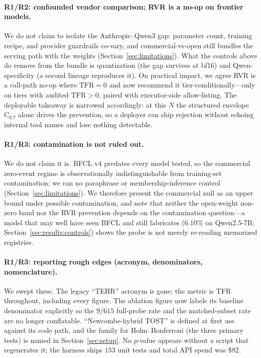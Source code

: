 \paragraph{R1/R2: confounded vendor comparison; RVR is a no-op on
frontier models.}
We do not claim to isolate the Anthropic--Qwen3 gap: parameter count,
training recipe, and provider guardrails co-vary, and commercial-vs-open
still bundles the serving path with the weights
(Section~\ref{sec:limitations}). What the controls above do remove from the
bundle is quantization (the gap survives at bf16) and Qwen-specificity (a
second lineage reproduces it). On practical impact, we agree RVR is a
call-path no-op where $\mathrm{TFR}\!=\!0$ and now recommend it
tier-conditionally---only on tiers with audited $\mathrm{TFR}\!>\!0$,
paired with executor-side allow-listing. The deployable takeaway is
narrowed accordingly: at this $N$ the structured envelope $\mathrm{C}_{0.7}$
alone drives the prevention, so a deployer can ship rejection without
echoing internal tool names and lose nothing detectable.

\paragraph{R1/R3: contamination is not ruled out.}
We do not claim it is. BFCL v4 predates every model tested, so the
commercial zero-event regime is observationally indistinguishable from
training-set contamination; we ran no paraphrase or membership-inference
control (Section~\ref{sec:limitations}). We therefore present the
commercial null as an upper bound under possible contamination, and note
that neither the open-weight non-zero band nor the RVR prevention depends
on the contamination question---a model that may well have seen BFCL and
still fabricates ($6.10\%$ on Qwen2.5-7B;
Section~\ref{sec:results:controls}) shows the probe is not merely
re-reading memorized registries.

\paragraph{R1/R3: reporting rough edges (acronym, denominators,
nomenclature).}
We swept these. The legacy ``TEHR'' acronym is gone; the metric is TFR
throughout, including every figure. The ablation figure now labels its
baseline denominator explicitly so the $9/615$ full-probe rate and the
matched-subset rate are no longer conflatable. ``Newcombe-hybrid TOST'' is
defined at first use against its code path, and the family for
Holm--Bonferroni (the three primary tests) is named in
Section~\ref{sec:setup}. No $p$-value appears without a script that
regenerates it; the harness ships $153$ unit tests and total API spend was
\$$82$.
